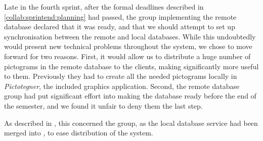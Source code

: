 Late in the fourth sprint, after the formal deadlines described in \cref{collab:sprintend:planning} had passed, the group implementing the remote database declared that it was ready, and that we should attempt to set up synchronisation between the remote and local databases. 
While this undoubtedly would present new technical problems throughout the system, we chose to move forward for two reasons. 
First, it would allow us to distribute a huge number of pictograms in the remote database to the clients, making \giraf significantly more useful to them.
Previously they had to create all the needed pictograms locally in \textit{Pictotegner}, the included graphics application. 
Second, the remote database group had put significant effort into making the database ready before the end of the semester, and we found it unfair to deny them the last step. 

As described in , this concerned the \launcher group, as the local database service had been merged into \launcher, to ease distribution of the system.

